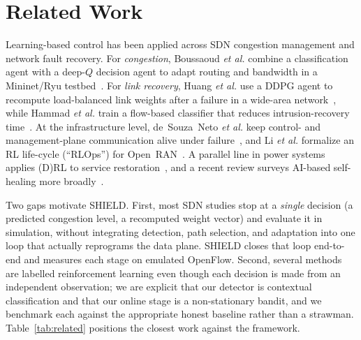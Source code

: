 \documentclass[conference]{IEEEtran}
\begin{document}
\section{Related Work}
\label{sec:related}
Learning-based control has been applied across SDN congestion management and network
fault recovery. For \emph{congestion}, Boussaoud \emph{et al.} combine a
classification agent with a deep-$Q$ decision agent to adapt routing and bandwidth in
a Mininet/Ryu testbed~\cite{boussaoud2025}. For \emph{link recovery}, Huang
\emph{et al.} use a DDPG agent to recompute load-balanced link weights after a
failure in a wide-area network~\cite{huang2025}, while Hammad \emph{et al.} train a
flow-based classifier that reduces intrusion-recovery time~\cite{hammad2023}. At the
infrastructure level, de~Souza~Neto \emph{et al.} keep control- and
management-plane communication alive under failure~\cite{neto2020}, and Li
\emph{et al.} formalize an RL life-cycle (``RLOps'') for Open~RAN~\cite{li2022rlops}.
A parallel line in power systems applies (D)RL to service
restoration~\cite{ferreira2019,jo2024}, and a recent review surveys AI-based
self-healing more broadly~\cite{kumar2023}.

Two gaps motivate SHIELD. First, most SDN studies stop at a \emph{single} decision
(a predicted congestion level, a recomputed weight vector) and evaluate it in
simulation, without integrating detection, path selection, and adaptation into one
loop that actually reprograms the data plane. SHIELD closes that loop end-to-end and
measures each stage on emulated OpenFlow. Second, several methods are labelled
reinforcement learning even though each decision is made from an independent
observation; we are explicit that our detector is contextual classification and that
our online stage is a non-stationary bandit, and we benchmark each against the
appropriate honest baseline rather than a strawman. Table~\ref{tab:related}
positions the closest work against the framework.
\end{document}
